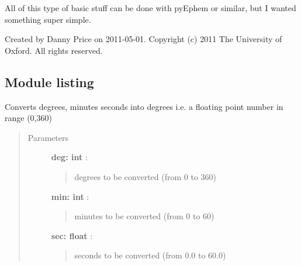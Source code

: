 \documentclass[letterpaper,10pt,english]{sphinxmanual}
\begin{document}
All of this type of basic stuff can be done with pyEphem or similar, but I wanted
something super simple.

Created by Danny Price on 2011-05-01.
Copyright (c) 2011 The University of Oxford. All rights reserved.


\subsection{Module listing}
\label{index:id1}

\begin{fulllineitems}
\label{index:astroCoords.decdms2deg}
Converts degrees, minutes seconds into degrees
i.e. a floating point number in range (0,360)
\begin{quote}\begin{description}
\item[{Parameters }] \leavevmode
\textbf{deg: int} :
\begin{quote}

degrees to be converted (from 0 to 360)
\end{quote}

\textbf{min: int} :
\begin{quote}

minutes to be converted (from 0 to 60)
\end{quote}

\textbf{sec: float} :
\begin{quote}

seconds to be converted (from 0.0 to 60.0)
\end{quote}

\end{description}\end{quote}

\end{fulllineitems}


\end{document}
